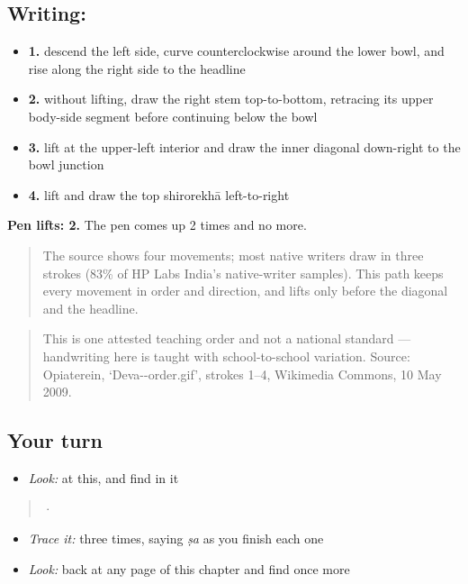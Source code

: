 \subsection*{Writing: }

\begin{itemize}
\raggedright
  \item \textbf{1.} descend the left side, curve counterclockwise around the lower bowl, and rise along the right side to the headline
  \item \textbf{2.} without lifting, draw the right stem top-to-bottom, retracing its upper body-side segment before continuing below the bowl
  \item \textbf{3.} lift at the upper-left interior and draw the inner diagonal down-right to the bowl junction
  \item \textbf{4.} lift and draw the top shirorekhā left-to-right
\end{itemize}

\textbf{Pen lifts: 2.} The pen comes up 2 times and no more.

\begin{quote}
The source shows four movements; most native writers draw  in three strokes (83\% of HP Labs India's native-writer samples). This path keeps every movement in order and direction, and lifts only before the diagonal and the headline.
\end{quote}

\begin{quote}
This is one attested teaching order and not a national standard — handwriting here is taught with school-to-school variation. Source: Opiaterein, ‘Deva--order.gif’, strokes 1–4, Wikimedia Commons, 10 May 2009.
\end{quote}

\subsection*{Your turn}
\begin{itemize}
\raggedright
  \item \emph{Look:} at this, and find  in it
\end{itemize}

\begin{quote}
  ·  
\end{quote}

\begin{itemize}
\raggedright
  \item \emph{Trace it:}  three times, saying \emph{ṣa} as you finish each one
  \item \emph{Look:} back at any page of this chapter and find  once more
\end{itemize}

